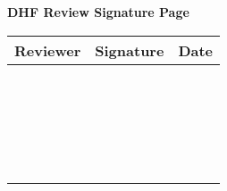 \thispagestyle{empty}

\begin{center}
	\textbf{\LARGE DHF Review Signature Page}
\end{center}

\renewcommand{\arraystretch}{2}
\begin{center}
	\begin{tabular}{|p{5cm}|p{5cm}|p{5cm}|} 
		\hline
		Reviewer & Signature & Date                   \\ 
		\hline
		&           &                        \\ 
		\hline
		&           &                        \\ 
		\hline
		&           &                        \\ 
		\hline
		&           &                        \\ 
		\hline
		&           &                        \\ 
		\hline
		&           &                        \\ 
		\hline
		&           &                        \\ 
		\hline
		&           &                        \\ 
		\hline
		&           &                        \\ 
		\hline
		&           &                        \\ 
		\hline
		&           &                        \\ 
		\hline
		&           &                        \\ 
		\hline
		&           &                        \\ 
		\hline
		&           &                        \\ 
		\hline
		&           &                        \\ 
		\hline
		&           &                        \\ 
		\hline
		&           &                        \\ 
		\hline
		&           &                        \\ 
		\hline
		&           &                        \\ 
		\hline
		&           &                        \\ 
		\hline
		&           &                        \\ 
		\hline
		&           &                        \\
		\hline
	\end{tabular}
\end{center}